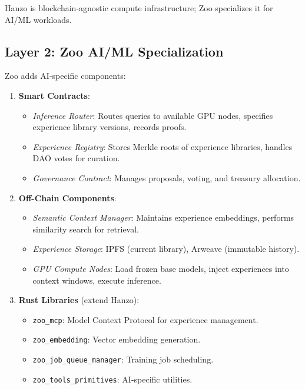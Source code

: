 \documentclass[11pt,a4paper]{article}
\begin{document}
Hanzo is blockchain-agnostic compute infrastructure; Zoo specializes it for AI/ML workloads.

\subsection{Layer 2: Zoo AI/ML Specialization}

Zoo adds AI-specific components:

\begin{enumerate}[leftmargin=*]
\item \textbf{Smart Contracts}:
   \begin{itemize}
   \item \textit{Inference Router}: Routes queries to available GPU nodes, specifies experience library versions, records proofs.
   \item \textit{Experience Registry}: Stores Merkle roots of experience libraries, handles DAO votes for curation.
   \item \textit{Governance Contract}: Manages proposals, voting, and treasury allocation.
   \end{itemize}

\item \textbf{Off-Chain Components}:
   \begin{itemize}
   \item \textit{Semantic Context Manager}: Maintains experience embeddings, performs similarity search for retrieval.
   \item \textit{Experience Storage}: IPFS (current library), Arweave (immutable history).
   \item \textit{GPU Compute Nodes}: Load frozen base models, inject experiences into context windows, execute inference.
   \end{itemize}

\item \textbf{Rust Libraries} (extend Hanzo):
   \begin{itemize}
   \item \texttt{zoo\_mcp}: Model Context Protocol for experience management.
   \item \texttt{zoo\_embedding}: Vector embedding generation.
   \item \texttt{zoo\_job\_queue\_manager}: Training job scheduling.
   \item \texttt{zoo\_tools\_primitives}: AI-specific utilities.
   \end{itemize}
\end{enumerate}
\end{document}
